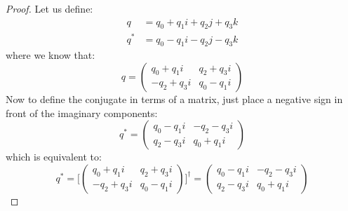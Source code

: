 \documentclass[12pt, letterpaper, onecolumn, conference, final]{IEEEtran}
\theoremstyle{definition}
\newtheorem{proposition}{Proposition}
\theoremstyle{plain}
\begin{document}
\begin{center}
\end{center}

\begin{proof}
Let us define:
\begin{equation*}
\begin{split}
q &= q_0 + q_1i + q_2j + q_3k \\
q^* &= q_0 - q_1i - q_2j - q_3k
\end{split}
\end{equation*}
where we know that:
\begin{equation*}
q = \begin{pmatrix}
q_0 + q_1i & q_2 + q_3i \\
-q_2 + q_3i & q_0 - q_1i
\end{pmatrix}
\end{equation*}
Now to define the conjugate in terms of a matrix, just place a negative sign in front of the imaginary components:
\begin{equation*}
q^* = \begin{pmatrix}
q_0 - q_1i & -q_2 - q_3i \\
q_2 - q_3i & q_0 + q_1i
\end{pmatrix}
\end{equation*}
which is equivalent to:
\begin{equation*}
q^* = \Bigg[ \begin{pmatrix}
q_0 + q_1i & q_2 + q_3i \\
-q_2 + q_3i & q_0 - q_1i
\end{pmatrix} \Bigg]^\dagger = \begin{pmatrix}
q_0 - q_1i & -q_2 - q_3i \\
q_2 - q_3i & q_0 + q_1i
\end{pmatrix}
\end{equation*}
\end{proof}

\begin{center}
\end{center}
\end{document}
